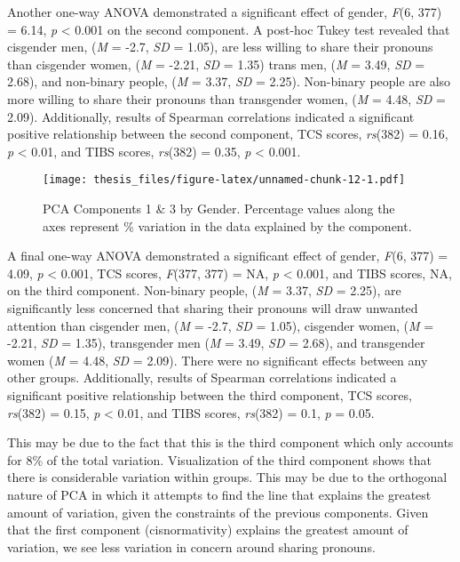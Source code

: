 \documentclass[12pt,twoside]{reedthesis}
\begin{document}
Another one-way ANOVA demonstrated a significant effect of gender, \emph{F}(6, 377) = 6.14, \emph{p} \textless{} 0.001 on the second component. A post-hoc Tukey test revealed that cisgender men, (\emph{M} = -2.7, \emph{SD} = 1.05), are less willing to share their pronouns than cisgender women, (\emph{M} = -2.21, \emph{SD} = 1.35) trans men, (\emph{M} = 3.49, \emph{SD} = 2.68), and non-binary people, (\emph{M} = 3.37, \emph{SD} = 2.25). Non-binary people are also more willing to share their pronouns than transgender women, (\emph{M} = 4.48, \emph{SD} = 2.09). Additionally, results of Spearman correlations indicated a significant positive relationship between the second component, TCS scores, \emph{rs}(382) = 0.16, \emph{p} \textless{} 0.01, and TIBS scores, \emph{rs}(382) = 0.35, \emph{p} \textless{} 0.001.
\begin{figure}
\centering
\texttt{[image: thesis\_files/figure-latex/unnamed-chunk-12-1.pdf]}
\caption{\label{fig:unnamed-chunk-12}PCA Components 1 \& 3 by Gender. Percentage values along the axes represent \% variation in the data explained by the component.}
\end{figure}
A final one-way ANOVA demonstrated a significant effect of gender, \emph{F}(6, 377) = 4.09, \emph{p} \textless{} 0.001, TCS scores, \emph{F}(377, 377) = NA, \emph{p} \textless{} 0.001, and TIBS scores, NA, on the third component. Non-binary people, (\emph{M} = 3.37, \emph{SD} = 2.25), are significantly less concerned that sharing their pronouns will draw unwanted attention than cisgender men, (\emph{M} = -2.7, \emph{SD} = 1.05), cisgender women, (\emph{M} = -2.21, \emph{SD} = 1.35), transgender men (\emph{M} = 3.49, \emph{SD} = 2.68), and transgender women (\emph{M} = 4.48, \emph{SD} = 2.09). There were no significant effects between any other groups. Additionally, results of Spearman correlations indicated a significant positive relationship between the third component, TCS scores, \emph{rs}(382) = 0.15, \emph{p} \textless{} 0.01, and TIBS scores, \emph{rs}(382) = 0.1, \emph{p} = 0.05.

This may be due to the fact that this is the third component which only accounts for 8\% of the total variation. Visualization of the third component shows that there is considerable variation within groups. This may be due to the orthogonal nature of PCA in which it attempts to find the line that explains the greatest amount of variation, given the constraints of the previous components. Given that the first component (cisnormativity) explains the greatest amount of variation, we see less variation in concern around sharing pronouns.
\end{document}
